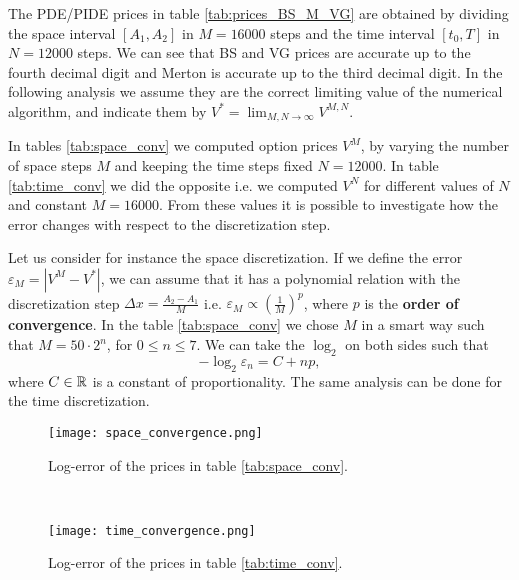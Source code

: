 The PDE/PIDE prices in table \ref{tab:prices_BS_M_VG} are obtained by dividing the space interval $[A_1,A_2]$ in $M=16000$ steps and the time interval $[t_0,T]$ in $N=12000$ steps.
We can see that BS and VG prices are accurate up to the fourth decimal digit and Merton is accurate up to the third decimal digit. 
In the following analysis we assume they are the correct limiting 
value of the numerical algorithm, and indicate them by $V^* = \lim_{M,N \to \infty} V^{M,N}$.

In tables \ref{tab:space_conv} we computed option prices $V^M$, by varying the number of space steps $M$ and keeping the time steps fixed $N=12000$.
In table \ref{tab:time_conv} we did the opposite i.e. we computed $V^N$ for different values of $N$ and constant $M=16000$.
From these values it is possible to investigate how the error changes with respect to the discretization step.

Let us consider for instance the space discretization. 
If we define the error $\varepsilon_M = |V^M - V^*|$, we can assume that it has a polynomial relation with the discretization step $\Delta x = \frac{A_2 - A_1}{M}$ i.e. 
$\varepsilon_M \propto (\frac{1}{M})^p$, where $p$ is the \textbf{order of convergence}.
In the table \ref{tab:space_conv} we chose $M$ in a smart way such that $M = 50\cdot2^n$, for $0 \leq n \leq 7$. We can take the $\log_2$ on both sides such that
\begin{equation}
 - \log_2 \varepsilon_n = C + np,
\end{equation}
where $C\in \mathbb{R}$ is a constant of proportionality. 
The same analysis can be done for the time discretization.
\begin{figure}[t!]
 \begin{minipage}[b]{0.5\linewidth}
   \centering
 \texttt{[image: space\_convergence.png]}
 \caption{Log-error of the prices in table \ref{tab:space_conv}.}
 \label{fig_space}
  \end{minipage}
 \ \hspace{2mm} \hspace{3mm} \
 \begin{minipage}[b]{0.5\linewidth}
 \centering
 \texttt{[image: time\_convergence.png]}
 \caption{Log-error of the prices in table \ref{tab:time_conv}.}
 \label{fig_time}
 \end{minipage}
\end{figure}

